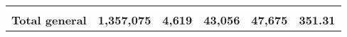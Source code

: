 \begin{tabular}{lrcclr}
	& \multicolumn{1}{l}{}                                           & \multicolumn{1}{l}{}                                       & \multicolumn{1}{l}{} &                                                                     & \multicolumn{1}{l}{}                                                         \\
	\rowcolor[HTML]{DDEBF7} 
	\textbf{Total   general}                                       & \textbf{1,357,075}                                             & \multicolumn{1}{r}{\cellcolor[HTML]{DDEBF7}\textbf{4,619}} & \textbf{43,056}      & \textbf{47,675}                                                     & \textbf{351.31}                                                             
\end{tabular}